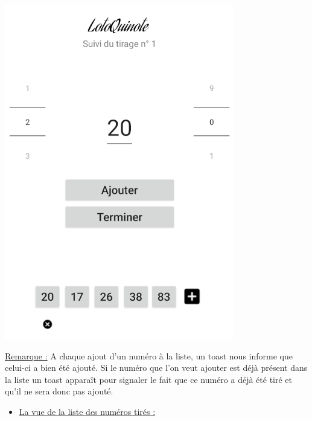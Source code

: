 \documentclass{article}
\begin{document}
    \hfill
    \begin{minipage}{.35\textwidth}%
        \includegraphics[scale=0.6]{suivi.png}
    \end{minipage}%
\vspace{2em}
\newline
\underline{Remarque :}  A chaque ajout d'un numéro à la liste, un toast nous informe que celui-ci a bien été ajouté. Si le numéro que l'on veut ajouter est déjà présent dans la liste un toast apparaît pour signaler le fait que ce numéro a déjà été tiré et qu'il ne sera donc pas ajouté.
\newpage
\begin{itemize}
    \item {\underline{\large{La vue de la liste des numéros tirés :}}}
\end{itemize}
\vspace{1em}
\end{document}
